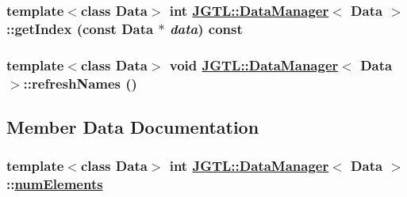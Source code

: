 \hypertarget{class_j_g_t_l_1_1_data_manager_401f692c79570aaef1e179d12f884758}{
\subsubsection[getIndex]{\setlength{\rightskip}{0pt plus 5cm}template$<$class Data$>$ int \hyperlink{class_j_g_t_l_1_1_data_manager}{JGTL::Data\-Manager}$<$ Data $>$::get\-Index (const Data $\ast$ {\em data}) const}}
\label{class_j_g_t_l_1_1_data_manager_401f692c79570aaef1e179d12f884758}


\hypertarget{class_j_g_t_l_1_1_data_manager_f588204810497ad82506075bea7c3ccc}{
\subsubsection[refreshNames]{\setlength{\rightskip}{0pt plus 5cm}template$<$class Data$>$ void \hyperlink{class_j_g_t_l_1_1_data_manager}{JGTL::Data\-Manager}$<$ Data $>$::refresh\-Names ()}}
\label{class_j_g_t_l_1_1_data_manager_f588204810497ad82506075bea7c3ccc}




\subsection{Member Data Documentation}
\hypertarget{class_j_g_t_l_1_1_data_manager_8819d3a793123ef49ee07bb11302af71}{
\subsubsection[numElements]{\setlength{\rightskip}{0pt plus 5cm}template$<$class Data$>$ int \hyperlink{class_j_g_t_l_1_1_data_manager}{JGTL::Data\-Manager}$<$ Data $>$::\hyperlink{class_j_g_t_l_1_1_data_manager_8819d3a793123ef49ee07bb11302af71}{num\-Elements}}}
\label{class_j_g_t_l_1_1_data_manager_8819d3a793123ef49ee07bb11302af71}


